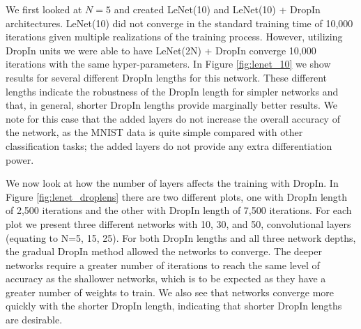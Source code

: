 \documentclass[10pt,twocolumn,letterpaper]{article}
\newcommand{\dropin}{DropIn }
\newcommand{\dropinNS}{DropIn}
\begin{document}
We first looked at $N=5$ and created LeNet(10) and LeNet(10) + \dropin architectures.   LeNet(10) did not converge in the standard training time of 10,000 iterations given multiple realizations of the training process.  
However, utilizing \dropin units we were able to have LeNet(2N) + \dropin  converge 10,000 iterations with the same hyper-parameters.  
In Figure \ref{fig:lenet_10} we show results for several different \dropin lengths for this network.  These different lengths indicate the robustness of the \dropin length for simpler networks and that, in general, shorter \dropin lengths provide marginally better results.
We note for this case that the added layers do not increase the overall accuracy of the network, as the MNIST data is quite simple compared with other classification tasks; the added layers do not provide any extra differentiation power.  


We now look at how the number of layers affects the training with \dropinNS.  
In Figure \ref{fig:lenet_droplens} there are two different plots, one with \dropin length of 2,500 iterations and the other with \dropin length of 7,500 iterations.  For each plot we present three different networks with 10, 30, and 50, convolutional layers (equating to N=5, 15, 25).  
For both \dropin lengths and all three network depths, the gradual \dropin method allowed the networks to converge.  
The deeper networks require a greater number of iterations to reach the same level of accuracy as the shallower networks, which is to be expected as they have a greater number of weights to train.  We also see that networks converge  more quickly with the shorter \dropin length,  indicating that shorter \dropin lengths are desirable.  




\end{document}
